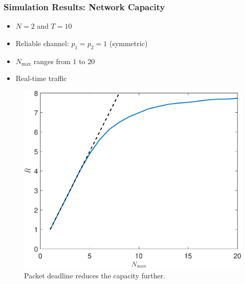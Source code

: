 \documentclass{beamer}
\begin{document}
\begin{frame}
\frametitle{Simulation Results: Network Capacity}
\begin{itemize}
\item $N=2$ and $T=10$
\item Reliable channel: $p_1 = p_2 = 1$ (symmetric)
\item $N_\text{max}$ ranges from $1$ to $20$
\item Real-time traffic
\end{itemize}
\begin{figure}
\centering
\includegraphics[height=.5\textheight]{realtime_throughput_randmax.pdf}
\caption{Packet deadline reduces the capacity further.}
\end{figure}
\end{frame}
\end{document}
